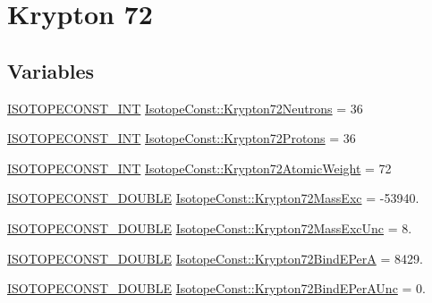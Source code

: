 \hypertarget{group___isotope_const-_krypton-_kr72}{}\section{Krypton 72}
\label{group___isotope_const-_krypton-_kr72}
\subsection*{Variables}
\begin{DoxyCompactItemize}
\item 
\mbox{\hyperlink{group___isotope_const-_macros_ga5f18360b3e99483a35c32d789e62621c}{I\+S\+O\+T\+O\+P\+E\+C\+O\+N\+S\+T\+\_\+\+I\+NT}} \mbox{\hyperlink{group___isotope_const-_krypton-_kr72_ga549fde19ff80267cdc70b2db057a00fc}{Isotope\+Const\+::\+Krypton72\+Neutrons}} = 36
\item 
\mbox{\hyperlink{group___isotope_const-_macros_ga5f18360b3e99483a35c32d789e62621c}{I\+S\+O\+T\+O\+P\+E\+C\+O\+N\+S\+T\+\_\+\+I\+NT}} \mbox{\hyperlink{group___isotope_const-_krypton-_kr72_ga6b4407aa434d2a7ed847d5d26b5ded31}{Isotope\+Const\+::\+Krypton72\+Protons}} = 36
\item 
\mbox{\hyperlink{group___isotope_const-_macros_ga5f18360b3e99483a35c32d789e62621c}{I\+S\+O\+T\+O\+P\+E\+C\+O\+N\+S\+T\+\_\+\+I\+NT}} \mbox{\hyperlink{group___isotope_const-_krypton-_kr72_ga2778006c03bbeddb299818de4ba941b6}{Isotope\+Const\+::\+Krypton72\+Atomic\+Weight}} = 72
\item 
\mbox{\hyperlink{group___isotope_const-_macros_ga8f45a7272ce02c0b4c65c44636ed719a}{I\+S\+O\+T\+O\+P\+E\+C\+O\+N\+S\+T\+\_\+\+D\+O\+U\+B\+LE}} \mbox{\hyperlink{group___isotope_const-_krypton-_kr72_ga66056275d274548c8e83d23f778536cf}{Isotope\+Const\+::\+Krypton72\+Mass\+Exc}} = -\/53940.
\item 
\mbox{\hyperlink{group___isotope_const-_macros_ga8f45a7272ce02c0b4c65c44636ed719a}{I\+S\+O\+T\+O\+P\+E\+C\+O\+N\+S\+T\+\_\+\+D\+O\+U\+B\+LE}} \mbox{\hyperlink{group___isotope_const-_krypton-_kr72_ga3a24579e3282be5e06754554dd05251b}{Isotope\+Const\+::\+Krypton72\+Mass\+Exc\+Unc}} = 8.
\item 
\mbox{\hyperlink{group___isotope_const-_macros_ga8f45a7272ce02c0b4c65c44636ed719a}{I\+S\+O\+T\+O\+P\+E\+C\+O\+N\+S\+T\+\_\+\+D\+O\+U\+B\+LE}} \mbox{\hyperlink{group___isotope_const-_krypton-_kr72_ga8660c7a2b70eb0b21db3c6457c91056b}{Isotope\+Const\+::\+Krypton72\+Bind\+E\+PerA}} = 8429.
\item 
\mbox{\hyperlink{group___isotope_const-_macros_ga8f45a7272ce02c0b4c65c44636ed719a}{I\+S\+O\+T\+O\+P\+E\+C\+O\+N\+S\+T\+\_\+\+D\+O\+U\+B\+LE}} \mbox{\hyperlink{group___isotope_const-_krypton-_kr72_ga66f7e364eccaa76a7ea3f8fc28facfee}{Isotope\+Const\+::\+Krypton72\+Bind\+E\+Per\+A\+Unc}} = 0.

\end{DoxyCompactItemize}
